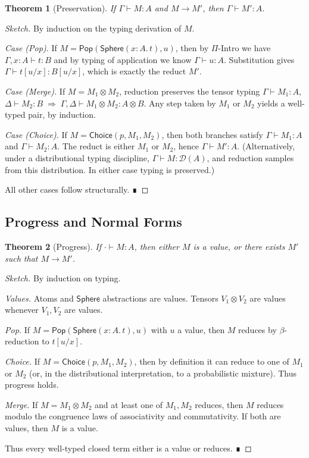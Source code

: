 \documentclass{article}
\newtheorem{theorem}{Theorem}[section]
\begin{document}
\begin{theorem}[Preservation]
If $\Gamma \vdash M : A$ and $M \to M'$, then $\Gamma \vdash M' : A$.
\end{theorem}

\begin{proof}[Sketch]
By induction on the typing derivation of $M$.  

\emph{Case (Pop).}  
If $M = \mathsf{Pop}(\mathsf{Sphere}(x{:}A.\,t), u)$, then by $\Pi$-Intro we
have $\Gamma, x:A \vdash t : B$ and by typing of application we know
$\Gamma \vdash u : A$. Substitution gives $\Gamma \vdash t[u/x] : B[u/x]$,
which is exactly the reduct $M'$.

\emph{Case (Merge).}  
If $M = M_1 \otimes M_2$, reduction preserves the tensor typing
$\Gamma \vdash M_1 : A$, $\Delta \vdash M_2 : B \;\Rightarrow\; \Gamma, \Delta \vdash M_1 \otimes M_2 : A \otimes B$.
Any step taken by $M_1$ or $M_2$ yields a well-typed pair, by induction.

\emph{Case (Choice).}  
If $M = \mathsf{Choice}(p, M_1, M_2)$, then both branches satisfy
$\Gamma \vdash M_1 : A$ and $\Gamma \vdash M_2 : A$. The reduct is either $M_1$
or $M_2$, hence $\Gamma \vdash M' : A$.  
(Alternatively, under a distributional typing discipline,
$\Gamma \vdash M : \mathcal{D}(A)$, and reduction samples from this
distribution. In either case typing is preserved.)

All other cases follow structurally. ∎
\end{proof}

\subsection{Progress and Normal Forms}

\begin{theorem}[Progress]
If $\cdot \vdash M : A$, then either $M$ is a value, or there exists $M'$ such that $M \to M'$.
\end{theorem}

\begin{proof}[Sketch]
By induction on typing.  

\emph{Values.}  
Atoms and $\mathsf{Sphere}$ abstractions are values.  
Tensors $V_1 \otimes V_2$ are values whenever $V_1, V_2$ are values.  

\emph{Pop.}  
If $M = \mathsf{Pop}(\mathsf{Sphere}(x{:}A.\,t), u)$ with $u$ a value, then $M$
reduces by $\beta$-reduction to $t[u/x]$.  

\emph{Choice.}  
If $M = \mathsf{Choice}(p, M_1, M_2)$, then by definition it can reduce to one
of $M_1$ or $M_2$ (or, in the distributional interpretation, to a probabilistic
mixture). Thus progress holds.  

\emph{Merge.}  
If $M = M_1 \otimes M_2$ and at least one of $M_1, M_2$ reduces, then $M$ reduces
modulo the congruence laws of associativity and commutativity. If both are values,
then $M$ is a value.  

Thus every well-typed closed term either is a value or reduces. ∎
\end{proof}
\end{document}
